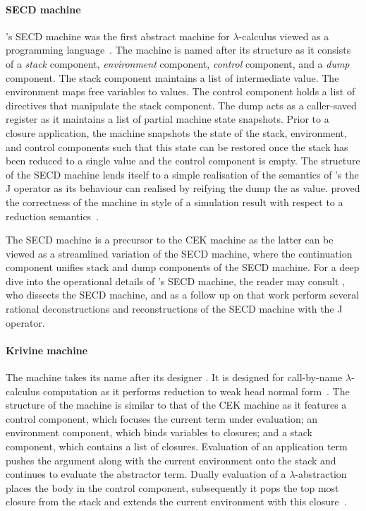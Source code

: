 \documentclass[12pt,phd,lfcs,twoside,openright,logo,leftchapter,normalheadings]{infthesis}
\theoremstyle{plain}
\theoremstyle{definition}
\begin{document}
\paragraph{SECD machine} \citeauthor{Landin64}'s SECD machine was the
first abstract machine for $\lambda$-calculus viewed as a programming
language~\cite{Landin64,Danvy04}. The machine is named after its
structure as it consists of a \emph{stack} component,
\emph{environment} component, \emph{control} component, and a
\emph{dump} component. The stack component maintains a list of
intermediate value. The environment maps free variables to values. The
control component holds a list of directives that manipulate the stack
component. The dump acts as a caller-saved register as it maintains a
list of partial machine state snapshots. Prior to a closure
application, the machine snapshots the state of the stack,
environment, and control components such that this state can be
restored once the stack has been reduced to a single value and the
control component is empty. The structure of the SECD machine lends
itself to a simple realisation of the semantics of
\citeauthor{Landin98}'s the J operator as its behaviour can realised
by reifying the dump the as value.
%
\citet{Plotkin75} proved the correctness of the machine in style of a
simulation result with respect to a reduction
semantics~\cite{AgerBDM03}.

The SECD machine is a precursor to the CEK machine as the latter can
be viewed as a streamlined variation of the SECD machine, where the
continuation component unifies stack and dump components of the SECD
machine.
%
For a deep dive into the operational details of
\citeauthor{Landin64}'s SECD machine, the reader may consult
\citet{Danvy04}, who dissects the SECD machine, and as a follow up on
that work \citet{DanvyM08} perform several rational deconstructions
and reconstructions of the SECD machine with the J operator.

\paragraph{Krivine machine} The \citeauthor{Krivine07} machine takes
its name after its designer \citet{Krivine07}. It is designed for
call-by-name $\lambda$-calculus computation as it performs reduction
to weak head normal form~\cite{Krivine07,Leroy90}.
%
The structure of the \citeauthor{Krivine07} machine is similar to that
of the CEK machine as it features a control component, which focuses
the current term under evaluation; an environment component, which
binds variables to closures; and a stack component, which contains a
list of closures.
%
Evaluation of an application term pushes the argument along with the
current environment onto the stack and continues to evaluate the
abstractor term. Dually evaluation of a $\lambda$-abstraction places
the body in the control component, subsequently it pops the top most
closure from the stack and extends the current environment with this
closure~\cite{DouenceF07}.
\end{document}
